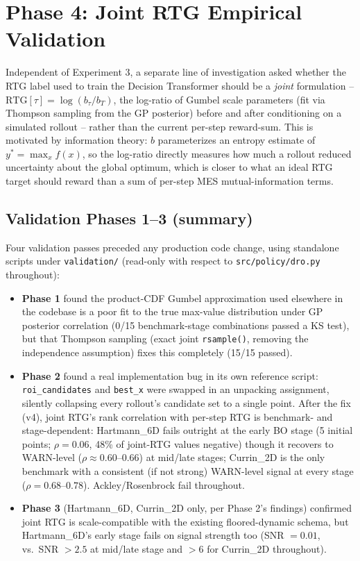 \documentclass[11pt]{article}
\begin{document}
\FloatBarrier
\section{Phase 4: Joint RTG Empirical Validation}
\label{sec:phase4}

Independent of Experiment 3, a separate line of investigation asked whether
the RTG label used to train the Decision Transformer should be a
\emph{joint} formulation -- $\mathrm{RTG}[\tau] = \log(b_\tau / b_T)$, the
log-ratio of Gumbel scale parameters (fit via Thompson sampling from the
GP posterior) before and after conditioning on a simulated rollout -- rather
than the current per-step reward-sum. This is motivated by information
theory: $b$ parameterizes an entropy estimate of $y^\ast = \max_x f(x)$, so
the log-ratio directly measures how much a rollout reduced uncertainty
about the global optimum, which is closer to what an ideal RTG target
should reward than a sum of per-step MES mutual-information terms.

\subsection{Validation Phases 1--3 (summary)}

Four validation passes preceded any production code change, using
standalone scripts under \texttt{validation/} (read-only with respect to
\texttt{src/policy/dro.py} throughout):
\begin{itemize}[itemsep=3pt]
    \item \textbf{Phase 1} found the product-CDF Gumbel approximation used
          elsewhere in the codebase is a poor fit to the true max-value
          distribution under GP posterior correlation (0/15 benchmark-stage
          combinations passed a KS test), but that Thompson sampling (exact
          joint \texttt{rsample()}, removing the independence assumption)
          fixes this completely (15/15 passed).
    \item \textbf{Phase 2} found a real implementation bug in its own
          reference script: \texttt{roi\_candidates} and \texttt{best\_x}
          were swapped in an unpacking assignment, silently collapsing every
          rollout's candidate set to a single point. After the fix (v4),
          joint RTG's rank correlation with per-step RTG is
          benchmark- and stage-dependent: Hartmann\_6D fails outright at the
          early BO stage (5 initial points; $\rho=0.06$, 48\% of joint-RTG
          values negative) though it recovers to WARN-level ($\rho\approx0.60$--$0.66$)
          at mid/late stages; Currin\_2D is the only benchmark with a
          consistent (if not strong) WARN-level signal at every stage
          ($\rho=0.68$--$0.78$). Ackley/Rosenbrock fail throughout.
    \item \textbf{Phase 3} (Hartmann\_6D, Currin\_2D only, per Phase 2's
          findings) confirmed joint RTG is scale-compatible with the
          existing floored-dynamic schema, but Hartmann\_6D's early stage
          fails on signal strength too (SNR $=0.01$, vs.\ SNR $>2.5$ at
          mid/late stage and $>6$ for Currin\_2D throughout).
\end{itemize}
\end{document}
